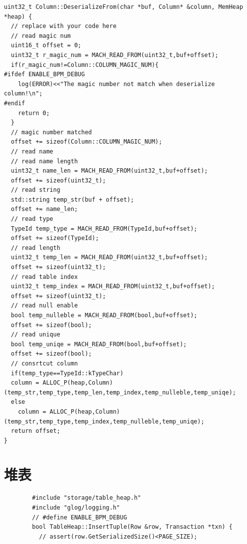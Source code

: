 \documentclass{article}
\begin{document}
\begin{appendices}
\begin{lstlisting}
uint32_t Column::DeserializeFrom(char *buf, Column* &column, MemHeap *heap) {
  // replace with your code here
  // read magic num
  uint16_t offset = 0;
  uint32_t r_magic_num = MACH_READ_FROM(uint32_t,buf+offset);
  if(r_magic_num!=Column::COLUMN_MAGIC_NUM){
#ifdef ENABLE_BPM_DEBUG
    log(ERROR)<<"The magic number not match when deserialize column!\n";
#endif
    return 0;
  }
  // magic number matched
  offset += sizeof(Column::COLUMN_MAGIC_NUM);
  // read name
  // read name length
  uint32_t name_len = MACH_READ_FROM(uint32_t,buf+offset);
  offset += sizeof(uint32_t);
  // read string
  std::string temp_str(buf + offset);
  offset += name_len;
  // read type
  TypeId temp_type = MACH_READ_FROM(TypeId,buf+offset);
  offset += sizeof(TypeId);
  // read length
  uint32_t temp_len = MACH_READ_FROM(uint32_t,buf+offset);
  offset += sizeof(uint32_t);
  // read table index 
  uint32_t temp_index = MACH_READ_FROM(uint32_t,buf+offset);
  offset += sizeof(uint32_t);
  // read null enable
  bool temp_nulleble = MACH_READ_FROM(bool,buf+offset);
  offset += sizeof(bool);
  // read unique
  bool temp_uniqe = MACH_READ_FROM(bool,buf+offset);
  offset += sizeof(bool);
  // consrtcut column
  if(temp_type==TypeId::kTypeChar)
  column = ALLOC_P(heap,Column)(temp_str,temp_type,temp_len,temp_index,temp_nulleble,temp_uniqe);
  else 
    column = ALLOC_P(heap,Column)(temp_str,temp_type,temp_index,temp_nulleble,temp_uniqe);
  return offset;
}

    \end{lstlisting}
    \section[B]{堆表}
    \begin{lstlisting}
        #include "storage/table_heap.h"
        #include "glog/logging.h"
        // #define ENABLE_BPM_DEBUG
        bool TableHeap::InsertTuple(Row &row, Transaction *txn) {
          // assert(row.GetSerializedSize()<PAGE_SIZE);
        

\end{lstlisting}
\end{appendices}
\end{document}

